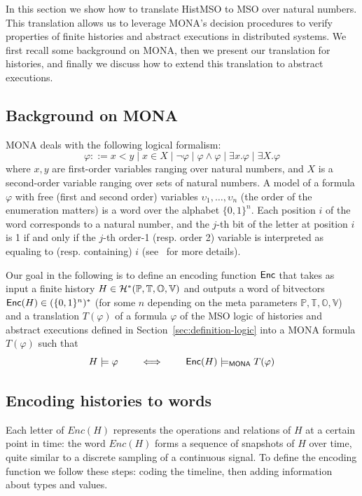 In this section we show how to translate HistMSO to MSO over natural numbers.
This translation allows us to leverage MONA's decision procedures to verify properties of finite histories and abstract executions in distributed systems. We first recall some background on MONA, then we present our translation for histories, and finally we discuss how to extend this translation to abstract executions.

\subsection{Background on MONA}

MONA deals with the following logical formalism:
$$
\varphi ::= x < y \mid x \in X \mid \neg \varphi \mid \varphi \land \varphi \mid \exists x.\varphi \mid \exists X.\varphi
$$
where $x,y$ are first-order variables ranging over natural numbers, and $X$ is a second-order variable ranging over sets of natural numbers. A model of a formula $\varphi$
with free (first and second order) variables $\upsilon_1,\ldots,\upsilon_n$ (the order of the enumeration matters) is a word over the alphabet $\{0,1\}^n$. Each position $i$ of the word corresponds to a natural number, and the $j$-th bit of the letter at position $i$ is 1 if and only if the $j$-th order-1 (resp. order 2) variable is interpreted as equaling to (resp. containing) $i$ (see~\cite{MONAguide} for more details).

Our goal in the following is to define an encoding function $\mathsf{Enc}$ that takes as input a finite history $H\in\mathcal{H}^*(\mathbb{P}, \mathbb{T}, \mathbb{O}, \mathbb{V})$ and outputs a word of bitvectors $\mathsf{Enc}(H)\in(\{0,1\}^n)^*$ (for some $n$ depending on the meta parameters $\mathbb{P}, \mathbb{T}, \mathbb{O}, \mathbb{V}$) and a translation $T(\varphi)$ of a formula $\varphi$ of the MSO logic of histories and abstract executions defined in Section~\ref{sec:definition-logic} into a MONA formula $T(\varphi)$ such that 
\begin{equation}\label{eq:correctness-of-translation}
H \models \varphi \qquad \iff \qquad \mathsf{Enc}(H) \models_{\tiny \mathsf{MONA}} T(\varphi)
\end{equation}

\subsection{Encoding histories to words}

Each letter of $Enc(H)$ represents the operations and relations of $H$ at a certain point in time: the word $Enc(H)$ forms a sequence of snapshots of $H$ over time, quite similar to a discrete sampling of a continuous signal. To define the encoding function we follow these steps: coding the timeline, then adding information about types and values.


